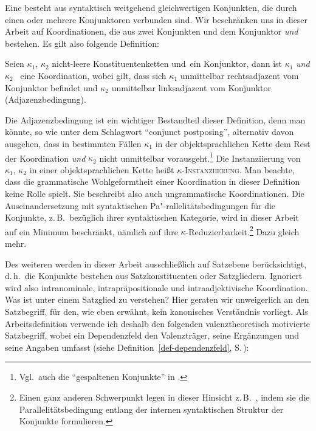 Eine  besteht aus syntaktisch weitgehend gleichwertigen Konjunkten, die durch einen oder mehrere Konjunktoren verbunden sind.  Wir beschränken uns in dieser Arbeit auf Koordinationen, die aus zwei Konjunkten und dem Konjunktor {\it und} bestehen. Es gilt also folgende Definition:
\begin{definition}[Koordination] 
Seien $\kappa_1$, $\kappa_2$ nicht-leere Konstituentenketten und\linebreak {}\grq\ ein Konjunktor, dann ist \glq$\kappa_1$ {\it und} $\kappa_2$\!\grq~ eine Koordination, wobei gilt, dass sich $\kappa_1$ unmittelbar rechtsadjazent vom Konjunktor befindet und $\kappa_2$ unmittelbar linksadjazent vom Konjunktor (Adjazenzbedingung). 
\end{definition}
Die Adjazenzbedingung ist ein wichtiger Bestandteil dieser Definition, denn man könnte, so wie \citet[546ff]{Hudson:76} unter dem Schlagwort "`conjunct postposing"', alternativ davon ausgehen, dass in bestimmten Fällen $\kappa_1$ in der objektsprachlichen Kette dem Rest der Koordination {\it und} $\kappa_2$ nicht unmittelbar vorausgeht.\footnote{Vgl.\ auch die "`gespaltenen Konjunkte"' in \cite{Hoehle:83}.} Die Instanziierung von $\kappa_1$, $\kappa_2$ in einer objektsprachlichen Kette hei\ss t \textsc{$\kappa$-Instanziierung}. Man beachte, dass die grammatische Wohlgeformtheit einer Koordination in dieser Definition keine Rolle spielt. Sie beschreibt also auch ungrammatische Koordinationen. Die Auseinandersetzung mit syntaktischen Pa"-rallelitätsbedingungen für die Konjunkte, z.\,B.\  bezüglich ihrer syntaktischen Kategorie, wird in dieser Arbeit auf ein Minimum beschränkt, nämlich auf ihre $\kappa$-Reduzierbarkeit.\footnote{Einen ganz anderen Schwerpunkt legen in dieser Hinsicht z.\,B.\ \cite{Sag:etal:85}, indem sie die Parallelitätsbedingung entlang der internen syntaktischen Struktur der Konjunkte formulieren.} Dazu gleich mehr. 

Des weiteren werden in dieser Arbeit ausschlie\ss lich  auf Satzebene berücksichtigt, d.\,h.\ die Konjunkte bestehen aus Satzkonstituenten oder Satzgliedern. Ignoriert wird also intranominale, intrapräpositionale und intraadjektivische Koordination. Was ist unter einem Satzglied zu verstehen? Hier geraten wir unweigerlich an den Satzbegriff, für den, wie eben erwähnt, kein kanonisches Verständnis vorliegt. Als Arbeitsdefinition verwende ich deshalb den folgenden valenztheoretisch motivierte Satzbegriff, wobei ein Dependenzfeld den Valenzträger, seine Ergänzungen und seine Angaben umfasst (siehe Definition~\ref{def-dependenzfeld}, S.\,\pageref{def-dependenzfeld}):


